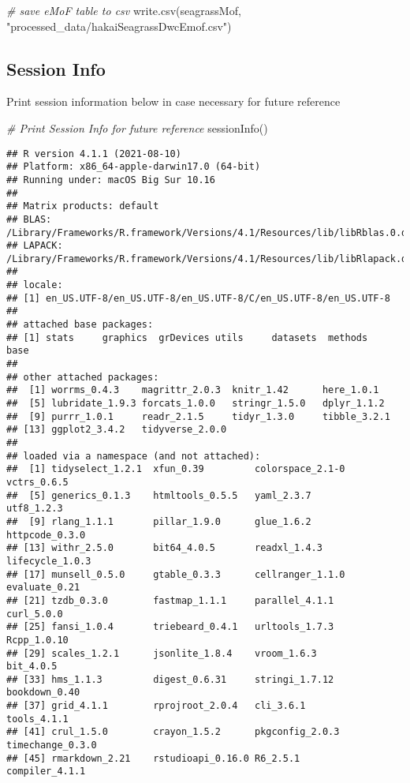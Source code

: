 \documentclass[
]{book}
\newenvironment{Shaded}{\begin{snugshade}}{\end{snugshade}}
\newcommand{\CommentTok}[1]{\textcolor[rgb]{0.56,0.35,0.01}{\textit{#1}}}
\newcommand{\FunctionTok}[1]{\textcolor[rgb]{0.00,0.00,0.00}{#1}}
\newcommand{\NormalTok}[1]{#1}
\newcommand{\StringTok}[1]{\textcolor[rgb]{0.31,0.60,0.02}{#1}}
\begin{document}
\begin{Shaded}
\begin{Highlighting}[]
\CommentTok{\# save eMoF table to csv}
\FunctionTok{write.csv}\NormalTok{(seagrassMof, }\StringTok{"processed\_data/hakaiSeagrassDwcEmof.csv"}\NormalTok{)}
\end{Highlighting}
\end{Shaded}

\hypertarget{session-info}{%
\subsection{Session Info}\label{session-info}}

Print session information below in case necessary for future reference

\begin{Shaded}
\begin{Highlighting}[]
\CommentTok{\# Print Session Info for future reference}
\FunctionTok{sessionInfo}\NormalTok{()}
\end{Highlighting}
\end{Shaded}

\begin{verbatim}
## R version 4.1.1 (2021-08-10)
## Platform: x86_64-apple-darwin17.0 (64-bit)
## Running under: macOS Big Sur 10.16
## 
## Matrix products: default
## BLAS:   /Library/Frameworks/R.framework/Versions/4.1/Resources/lib/libRblas.0.dylib
## LAPACK: /Library/Frameworks/R.framework/Versions/4.1/Resources/lib/libRlapack.dylib
## 
## locale:
## [1] en_US.UTF-8/en_US.UTF-8/en_US.UTF-8/C/en_US.UTF-8/en_US.UTF-8
## 
## attached base packages:
## [1] stats     graphics  grDevices utils     datasets  methods   base     
## 
## other attached packages:
##  [1] worrms_0.4.3    magrittr_2.0.3  knitr_1.42      here_1.0.1     
##  [5] lubridate_1.9.3 forcats_1.0.0   stringr_1.5.0   dplyr_1.1.2    
##  [9] purrr_1.0.1     readr_2.1.5     tidyr_1.3.0     tibble_3.2.1   
## [13] ggplot2_3.4.2   tidyverse_2.0.0
## 
## loaded via a namespace (and not attached):
##  [1] tidyselect_1.2.1  xfun_0.39         colorspace_2.1-0  vctrs_0.6.5      
##  [5] generics_0.1.3    htmltools_0.5.5   yaml_2.3.7        utf8_1.2.3       
##  [9] rlang_1.1.1       pillar_1.9.0      glue_1.6.2        httpcode_0.3.0   
## [13] withr_2.5.0       bit64_4.0.5       readxl_1.4.3      lifecycle_1.0.3  
## [17] munsell_0.5.0     gtable_0.3.3      cellranger_1.1.0  evaluate_0.21    
## [21] tzdb_0.3.0        fastmap_1.1.1     parallel_4.1.1    curl_5.0.0       
## [25] fansi_1.0.4       triebeard_0.4.1   urltools_1.7.3    Rcpp_1.0.10      
## [29] scales_1.2.1      jsonlite_1.8.4    vroom_1.6.3       bit_4.0.5        
## [33] hms_1.1.3         digest_0.6.31     stringi_1.7.12    bookdown_0.40    
## [37] grid_4.1.1        rprojroot_2.0.4   cli_3.6.1         tools_4.1.1      
## [41] crul_1.5.0        crayon_1.5.2      pkgconfig_2.0.3   timechange_0.3.0 
## [45] rmarkdown_2.21    rstudioapi_0.16.0 R6_2.5.1          compiler_4.1.1
\end{verbatim}
\end{document}
